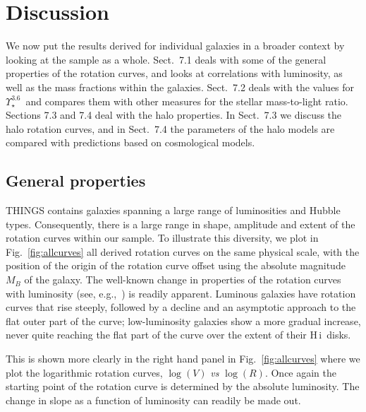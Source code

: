 \documentclass[usenatbib,usegraphicx,apjfonts,floatfix]{emulateapj}
\newcommand{\HI}{H\,{\sc i}}
\newcommand{\Ups}{\ensuremath{\Upsilon_{\star}^{3.6}}}
\begin{document}
\section{Discussion}

We now put the results derived for individual galaxies in a broader
context by looking at the sample as a whole.  Sect.~7.1 deals with
some of the general properties of the rotation curves, and looks at
correlations with luminosity, as well as the mass fractions within the
galaxies. Sect.~7.2 deals with the values for \Ups\ and compares them
with other measures for the stellar mass-to-light ratio.  Sections 7.3
and 7.4 deal with the halo properties. In Sect.~7.3 we discuss the
halo rotation curves, and in Sect.~7.4 the parameters of the halo
models are compared with predictions based on cosmological models.

\subsection{General properties\label{sec:genprop}}

THINGS contains galaxies spanning a large range of luminosities and
Hubble types. Consequently, there is a large range in shape, amplitude
and extent of the rotation curves within our sample.  To illustrate 
this diversity, we plot in Fig.~\ref{fig:allcurves} all derived
rotation curves on the same physical scale, with the position of the
origin of the rotation curve offset using the absolute magnitude $M_B$
of the galaxy.  The well-known change in properties of the rotation
curves with luminosity (see, e.g.,\ \citealt{broeils_phd}) is readily
apparent. Luminous galaxies have rotation curves that rise steeply,
followed by a decline and an asymptotic approach to the flat outer
part of the curve; low-luminosity galaxies show a more gradual increase, never
quite reaching the flat part of the curve over the extent of their
\HI\ disks.

This is shown more clearly in the right hand panel in
Fig.~\ref{fig:allcurves} where we plot the logarithmic rotation
curves, $\log(V)$ \emph{vs} $\log(R)$.  Once again the starting point
of the rotation curve is determined by the absolute luminosity. The
change in slope as a function of luminosity can readily be made out.
\end{document}

